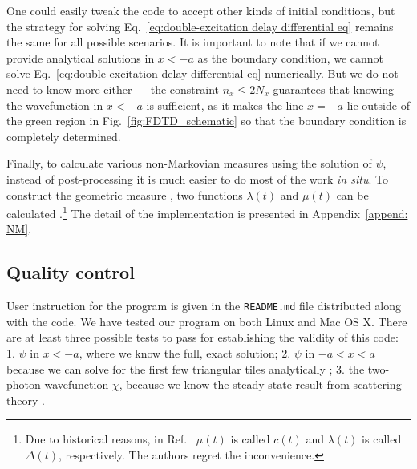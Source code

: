 \documentclass[12pt,letter,onecolumn,notitlepage]{article}
\begin{document}
One could easily tweak the code to accept other kinds of initial conditions, but the strategy for solving Eq.~\eqref{eq:double-excitation delay differential eq} remains the same for all possible scenarios. It is important to note that if we cannot provide analytical solutions in $x<-a$ as the boundary condition, we cannot solve Eq.~\eqref{eq:double-excitation delay differential eq} numerically. But we do not need to know more either --- the constraint $n_x\leq 2N_x$ guarantees that knowing the wavefunction in $x<-a$ is sufficient, as it makes the line $x=-a$ lie outside of the green region in Fig.~\ref{fig:FDTD_schematic} so that the boundary condition is completely determined. 

Finally, to calculate various non-Markovian measures using the solution of $\psi$, instead of post-processing it is much easier to do most of the work \textit{in situ}. To construct the geometric measure \cite{LorenzoPRA13}, two functions $\lambda(t)$ and $\mu(t)$ can be calculated \cite{FangNM17}.\footnote{Due to historical reasons, in Ref.~\cite{FangNM17} $\mu(t)$ is called $c(t)$ and $\lambda(t)$ is called $\Delta(t)$, respectively. The authors regret the inconvenience.\label{note5}}
The detail of the implementation is presented in Appendix~\ref{append: NM}. 


\subsection{Quality control}
User instruction for the program is given in the \texttt{README.md} file distributed along with the code.
We have tested our program on both Linux and Mac OS X.
There are at least three possible tests to pass for establishing the validity of this code: 1. $\psi$ in $x<-a$, where we know the full, exact solution; 2. $\psi$ in $-a<x<a$ because we can solve for the first few triangular tiles analytically \cite{FangNM17}; 3. the two-photon wavefunction $\chi$, because we know the steady-state result from scattering theory \cite{FangPRA15}.
\end{document}
